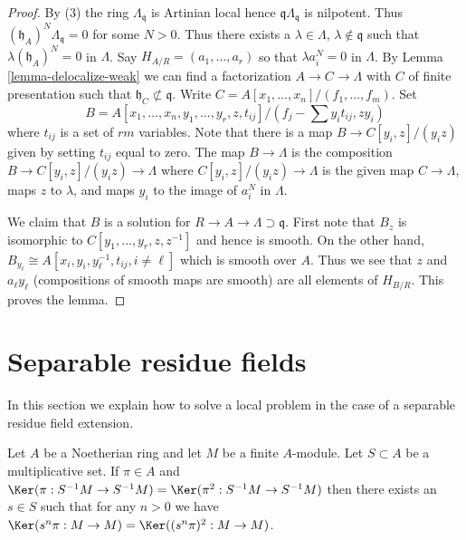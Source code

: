 \begin{proof}
By (3) the ring $\Lambda_\mathfrak q$ is Artinian local hence
$\mathfrak q\Lambda_\mathfrak q$ is nilpotent. Thus
$(\mathfrak h_A)^N \Lambda_\mathfrak q = 0$ for some $N > 0$.
Thus there exists a $\lambda \in \Lambda$, $\lambda \not \in \mathfrak q$
such that $\lambda (\mathfrak h_A)^N = 0$ in $\Lambda$.
Say $H_{A/R} = (a_1, \ldots, a_r)$ so that $\lambda a_i^N = 0$
in $\Lambda$. By Lemma \ref{lemma-delocalize-weak} we can find a factorization
$A \to C \to \Lambda$ with $C$ of finite presentation such that
$\mathfrak h_C \not \subset \mathfrak q$.
Write $C = A[x_1, \ldots, x_n]/(f_1, \ldots, f_m)$.
Set
$$
B = A[x_1, \ldots, x_n, y_1, \ldots, y_r, z, t_{ij}]/
(f_j - \sum y_i t_{ij}, zy_i)
$$
where $t_{ij}$ is a set of $rm$ variables.
Note that there is a map $B \to C[y_i, z]/(y_iz)$ given by setting $t_{ij}$
equal to zero. The map $B \to \Lambda$ is the composition
$B \to C[y_i, z]/(y_iz) \to \Lambda$ where $C[y_i, z]/(y_iz) \to \Lambda$
is the given map $C \to \Lambda$, maps $z$ to $\lambda$, and maps
$y_i$ to the image of $a_i^N$ in $\Lambda$.

\medskip\noindent
We claim that $B$ is a solution for $R \to A \to \Lambda \supset \mathfrak q$.
First note that $B_z$ is isomorphic to $C[y_1, \ldots, y_r, z, z^{-1}]$
and hence is smooth. On the other hand,
$B_{y_\ell} \cong A[x_i, y_i, y_\ell^{-1}, t_{ij}, i \not = \ell]$
which is smooth over $A$. Thus we see that $z$ and $a_\ell y_\ell$
(compositions of smooth maps are smooth) are all
elements of $H_{B/R}$. This proves the lemma.
\end{proof}




\section{Separable residue fields}
\label{section-separable}

\noindent
In this section we explain how to solve a local problem in the case
of a separable residue field extension.

\begin{lemma}[Ogoma]
\label{lemma-ogoma}
Let $A$ be a Noetherian ring and let $M$ be a finite $A$-module.
Let $S \subset A$ be a multiplicative set. If $\pi \in A$ and
$\Ker(\pi : S^{-1}M \to S^{-1}M) =
\Ker(\pi^2 : S^{-1}M \to S^{-1}M)$
then there exists an $s \in S$ such that for any $n > 0$ we have
$\Ker(s^n\pi : M \to M) = \Ker((s^n\pi)^2 : M \to M)$.
\end{lemma}

